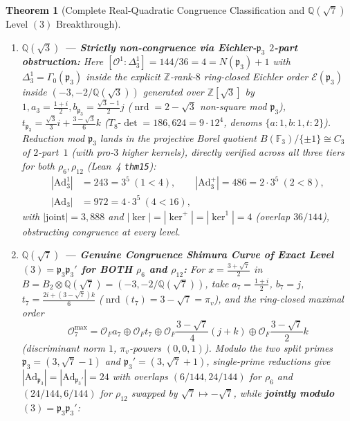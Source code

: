 \documentclass[11pt]{amsart}
\numberwithin{equation}{section}
\theoremstyle{plain}
\newtheorem{theorem}{Theorem}[section]
\theoremstyle{definition}\newtheorem{definition}[theorem]{Definition}
\theoremstyle{remark}\newtheorem{remark}[theorem]{Remark}
\newcommand{\Q}{\mathbb{Q}}
\newcommand{\Z}{\mathbb{Z}}
\newcommand{\F}{\mathbb{F}}
\newcommand{\calO}{\mathcal{O}}
\newcommand{\calE}{\mathcal{E}}
\newcommand{\frp}{\mathfrak{p}}
\newcommand{\frq}{\mathfrak{q}}
\newcommand{\SL}{\mathrm{SL}}
\newcommand{\Ad}{\mathrm{Ad}}
\newcommand{\nrd}{\operatorname{nrd}}
\begin{document}
\begin{theorem}[Complete Real-Quadratic Congruence Classification and $\Q(\sqrt{7})$ Level $(3)$ Breakthrough]
\begin{enumerate}[label=(\arabic*),nosep]
\begin{equation}\label{eq:qsqrt2_noniso_kernels}
\ker_{12}(\rho_6) \cong C_6{\times}C_2\ (\{1{:}1,2{:}3,3{:}2,6{:}6\}), \quad \ker_{12}(\rho_{12}) \cong A_4\ (\{1{:}1,2{:}3,3{:}8\}).
\end{equation}
Because $|\ker^1|_2 = 4 > 1 = |B(\F_7)/\{\pm 1\}|_2$ (with $1+\frq_7$ pro-$7$ and $\SL_2(\calO_{F,\frq})$ perfect for all $\frq\neq v,\frq_7$; Lean~4 \texttt{thm15}), both realizations are strictly non-congruence.
\item \textbf{$\Q(\sqrt{3})$ --- Strictly non-congruence via Eichler-$\frp_3$ $2$-part obstruction:} Here $[\calO^1 : \Delta_3^1] = 144/36 = 4 = N(\frp_3)+1$ with $\Delta_3^1 = \Gamma_0(\frp_3)$ inside the explicit $\Z$-rank-$8$ ring-closed Eichler order $\calE(\frp_3)$ inside $(-3,-2/\Q(\sqrt{3}))$ generated over $\Z[\sqrt{3}]$ by $1, a_3=\frac{1+i}{2}, b_{\frp_3}=\frac{\sqrt{3}-1}{2}j$ ($\nrd=2-\sqrt{3}$ non-square mod $\frp_3$), $t_{\frp_3}=\frac{\sqrt{3}}{3}i + \frac{3-\sqrt{3}}{6}k$ ($T_8\text{-}\det = 186{,}624 = 9\cdot 12^4$, denoms $\{a:1,b:1,t:2\}$). Reduction mod $\frp_3$ lands in the projective Borel quotient $B(\F_3)/\{\pm 1\}\cong C_3$ of $2$-part~$1$ (with pro-$3$ higher kernels), directly verified across all three tiers for both $\rho_6,\rho_{12}$ (Lean~4 \texttt{thm15}):
\begin{equation}\label{eq:qsqrt3_2part}
\begin{aligned}
|\Ad_3^1| &= 243 = 3^5\ (1{<}4),\qquad |\Ad_3^+| = 486 = 2{\cdot}3^5\ (2{<}8),\\
|\Ad_3| &= 972 = 4{\cdot}3^5\ (4{<}16),
\end{aligned}
\end{equation}
with $|\mathrm{joint}|=3{,}888$ and $|\ker|=|\ker^+|=|\ker^1|=4$ (overlap $36/144$), obstructing congruence at every level.
\item \textbf{$\Q(\sqrt{7})$ --- Genuine Congruence Shimura Curve of Exact Level $(3) = \frp_3\frp_3'$ for BOTH $\rho_6$ and $\rho_{12}$:} For $x=\frac{3+\sqrt{7}}{2}$ in $B = B_2\otimes\Q(\sqrt{7}) = (-3,-2/\Q(\sqrt{7}))$, take $a_7=\frac{1+i}{2}$, $b_7=j$, $t_7=\frac{2i+(3-\sqrt{7})k}{6}$ ($\nrd(t_7)=3-\sqrt{7}=\pi_v$), and the ring-closed maximal order
\begin{equation}\label{eq:O7_max}
\calO_7^{\max} = \calO_F a_7 \oplus \calO_F t_7 \oplus \calO_F\frac{3-\sqrt{7}}{4}(j+k) \oplus \calO_F\frac{3-\sqrt{7}}{2}k
\end{equation}
(discriminant norm $1$, $\pi_v$-powers $(0,0,1)$). Modulo the two split primes $\frp_3=(3,\sqrt{7}-1)$ and $\frp_3'=(3,\sqrt{7}+1)$, single-prime reductions give $|\Ad_{\frp_3}| = |\Ad_{\frp_3'}| = 24$ with overlaps $(6/144, 24/144)$ for $\rho_6$ and $(24/144, 6/144)$ for $\rho_{12}$ swapped by $\sqrt{7}\mapsto -\sqrt{7}$, while \textbf{jointly modulo $(3) = \frp_3\frp_3'$}:

\end{enumerate}
\end{theorem}
\end{document}
